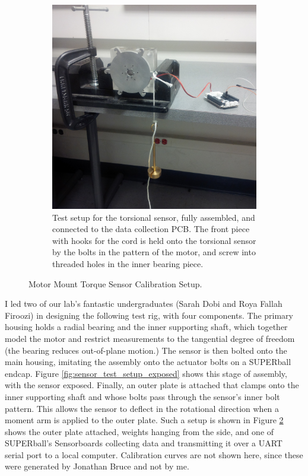 \documentclass[12pt]{report}
\begin{document}
\begin{figure}[hbt]
\begin{center}
\begin{subfigure}[t]{0.45\textwidth}
      \includegraphics[width=1\textwidth]{./img/test_setup_complete.jpg}
      \caption{Test setup for the torsional sensor, fully assembled, and connected to the data collection PCB. The front piece with hooks for the cord is held onto the torsional sensor by the bolts in the pattern of the motor, and screw into threaded holes in the inner bearing piece.}
      \label{fig:sensor_test_setup_complete}
    \end{subfigure}
    \caption{Motor Mount Torque Sensor Calibration Setup.}
  \end{center}
\end{figure}

\newpage

I led two of our lab's fantastic undergraduates (Sarah Dobi and Roya Fallah Firoozi) in designing the following test rig, with four components.
The primary housing holds a radial bearing and the inner supporting shaft, which together model the motor and restrict measurements to the tangential degree of freedom (the bearing reduces out-of-plane motion.)
The sensor is then bolted onto the main housing, imitating the assembly onto the actuator bolts on a SUPERball endcap.
Figure \ref{fig:sensor_test_setup_exposed} shows this stage of assembly, with the sensor exposed.
Finally, an outer plate is attached that clamps onto the inner supporting shaft and whose bolts pass through the sensor's inner bolt pattern.
This allows the sensor to deflect in the rotational direction when a moment arm is applied to the outer plate.
Such a setup is shown in Figure \ref{fig:sensor_test_setup_complete} shows the outer plate attached, weights hanging from the side, and one of SUPERball's Sensorboards collecting data and transmitting it over a UART serial port to a local computer.
Calibration curves are not shown here, since these were generated by Jonathan Bruce and not by me.
\end{document}
